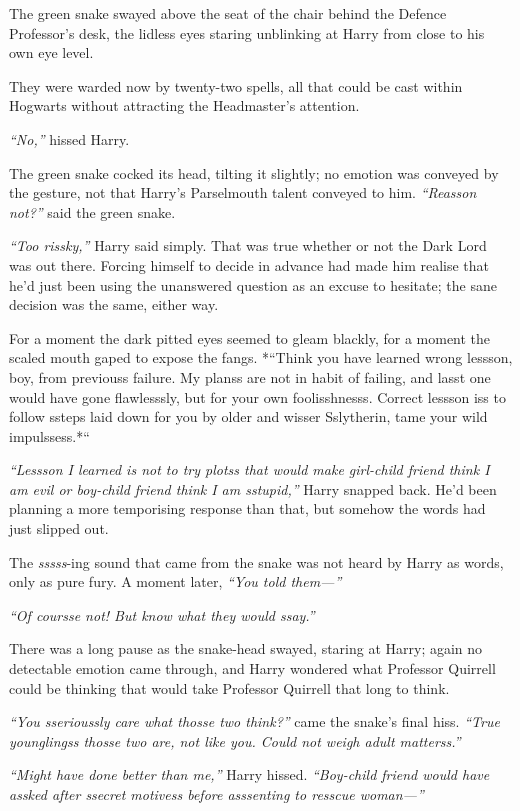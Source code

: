 The green snake swayed above the seat of the chair behind the Defence
Professor's desk, the lidless eyes staring unblinking at Harry from
close to his own eye level.

They were warded now by twenty-two spells, all that could be cast within
Hogwarts without attracting the Headmaster's attention.

\emph{``No,''} hissed Harry.

The green snake cocked its head, tilting it slightly; no emotion was
conveyed by the gesture, not that Harry's Parselmouth talent conveyed to
him. \emph{``Reasson not?''} said the green snake.

\emph{``Too rissky,''} Harry said simply. That was true whether or not
the Dark Lord was out there. Forcing himself to decide in advance had
made him realise that he'd just been using the unanswered question as an
excuse to hesitate; the sane decision was the same, either way.

For a moment the dark pitted eyes seemed to gleam blackly, for a moment
the scaled mouth gaped to expose the fangs. *``Think you have learned
wrong lessson, boy, from previouss failure. My planss are not in habit
of failing, and lasst one would have gone flawlesssly, but for your own
foolisshnesss. Correct lessson iss to follow ssteps laid down for you by
older and wisser Sslytherin, tame your wild impulssess.*``

\emph{``Lessson I learned is not to try plotss that would make
girl-child friend think I am evil or boy-child friend think I am
sstupid,''} Harry snapped back. He'd been planning a more temporising
response than that, but somehow the words had just slipped out.

The \emph{sssss}-ing sound that came from the snake was not heard by
Harry as words, only as pure fury. A moment later, \emph{``You told
them---''}

\emph{``Of coursse not! But know what they would ssay.''}

There was a long pause as the snake-head swayed, staring at Harry; again
no detectable emotion came through, and Harry wondered what Professor
Quirrell could be thinking that would take Professor Quirrell that long
to think.

\emph{``You sserioussly care what thosse two think?''} came the snake's
final hiss. \emph{``True younglingss thosse two are, not like you. Could
not weigh adult matterss.''}

\emph{``Might have done better than me,''} Harry hissed.
\emph{``Boy-child friend would have assked after ssecret motivess before
asssenting to resscue woman---''}

